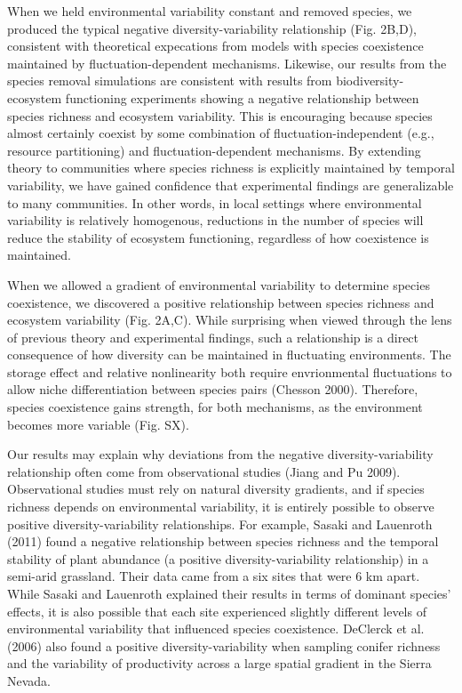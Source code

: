 \documentclass[12pt,]{article}
\begin{document}
When we held environmental variability constant and removed species, we
produced the typical negative diversity-variability relationship (Fig.
2B,D), consistent with theoretical expecations from models with species
coexistence maintained by fluctuation-dependent mechanisms. Likewise,
our results from the species removal simulations are consistent with
results from biodiversity-ecosystem functioning experiments showing a
negative relationship between species richness and ecosystem
variability. This is encouraging because species almost certainly
coexist by some combination of fluctuation-independent (e.g., resource
partitioning) and fluctuation-dependent mechanisms. By extending theory
to communities where species richness is explicitly maintained by
temporal variability, we have gained confidence that experimental
findings are generalizable to many communities. In other words, in local
settings where environmental variability is relatively homogenous,
reductions in the number of species will reduce the stability of
ecosystem functioning, regardless of how coexistence is maintained.

When we allowed a gradient of environmental variability to determine
species coexistence, we discovered a positive relationship between
species richness and ecosystem variability (Fig. 2A,C). While surprising
when viewed through the lens of previous theory and experimental
findings, such a relationship is a direct consequence of how diversity
can be maintained in fluctuating environments. The storage effect and
relative nonlinearity both require envrionmental fluctuations to allow
niche differentiation between species pairs (Chesson 2000). Therefore,
species coexistence gains strength, for both mechanisms, as the
environment becomes more variable (Fig. SX).

Our results may explain why deviations from the negative
diversity-variability relationship often come from observational studies
(Jiang and Pu 2009). Observational studies must rely on natural
diversity gradients, and if species richness depends on environmental
variability, it is entirely possible to observe positive
diversity-variability relationships. For example, Sasaki and Lauenroth
(2011) found a negative relationship between species richness and the
temporal stability of plant abundance (a positive diversity-variability
relationship) in a semi-arid grassland. Their data came from a six sites
that were 6 km apart. While Sasaki and Lauenroth explained their results
in terms of dominant species' effects, it is also possible that each
site experienced slightly different levels of environmental variability
that influenced species coexistence. DeClerck et al. (2006) also found a
positive diversity-variability when sampling conifer richness and the
variability of productivity across a large spatial gradient in the
Sierra Nevada.
\end{document}
